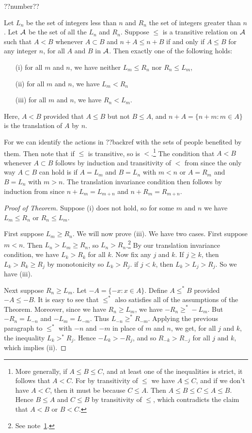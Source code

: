 ??number??
\begin{theorem} Let $L_n$ be the set of integers less than $n$
and $R_n$ the set of integers greater than $n$. Let $\mathcal A$ be the set of all
the $L_n$ and $R_n$. Suppose $\le$ is a transitive relation on $\mathcal A$ such that 
$A<B$ whenever $A\subset B$ and $n+A\le n+B$ if and only if $A\le B$ for any integer
$n$, for all $A$ and $B$ in $\mathcal A$. Then exactly one of the following holds:
\begin{itemize}
\item[{(i)}] for all $m$ and $n$, we have neither $L_m\le R_n$ nor $R_n\le L_m$,
\item[{(ii)}] for all $m$ and $n$, we have $L_m<R_n$
\item[{(iii)}] for all $m$ and $n$, we have $R_n<L_m$.
\end{itemize}
\end{theorem}
Here, $A<B$ provided that $A\le B$ but not $B\le A$, and $n+A=\{n+m:m\in A\}$ is the 
translation of $A$ by $n$.

For we can identify the actions in ??backref with the sets of people benefited by them.
Then note that if $\le$ is transitive, so is $<$.\footnote{\label{fn:trans}More generally, if $A\le B\le C$, and 
at least  one of the inequalities is strict, it follows that $A<C$. For by transitivity of 
$\le$ we have $A\le C$, and if we don't have $A<C$, then it must be because $C\le A$. Then
$A\le B\le C\le A\le B$. Hence $B\le A$ and $C\le B$ by transitivity of $\le$, which contradicts
the claim that $A<B$ or $B<C$.}
The condition that $A<B$ whenever $A\subset B$ follows by induction and transitivity of $<$ 
from  since the only way
$A\subset B$ can hold is if $A=L_m$ and $B=L_n$ with $m<n$ or $A=R_m$ and $B=L_n$ with $m>n$.
The translation invariance condition then follows by induction from  since $n+L_m=L_{m+n}$
and $n+R_m=R_{m+n}$.

\begin{proof}[Proof of Theorem]
Suppose (i) does not hold, so for some $m$ and $n$ we have $L_m\le R_n$ or $R_n\le L_m$.

First suppose $L_m\ge R_n$. We will now prove (iii). 
We have two cases. First suppose $m<n$. Then 
$L_n>L_m\ge R_n$, so $L_n>R_n$.\footnote{See note~\ref{fn:trans}.}
By our translation invariance condition, we have $L_k>R_k$ for all $k$.
Now fix any $j$ and $k$. If $j\ge k$, then 
$L_k>R_k\ge R_j$ by monotonicity so $L_k>R_j$. if 
$j<k$, then $L_k>L_j>R_j$. So we have (iii).

Next suppose $R_n\ge L_m$. Let $-A = \{ -x : x \in A \}$.
Define $A \le^* B$ provided $-A \le -B$. It is easy 
to see that $\le^*$ also satisfies all of the 
assumptions of the Theorem. Moreover, since we have
$R_n\ge L_m$, we have $-R_n\ge^* -L_m$. But 
$-R_n = L_{-n}$ and $-L_m=L_{-m}$. Thus $L_{-n}\ge^* R_{-m}$.
Applying the previous paragraph to $\le^*$ with 
$-n$ and $-m$ in place of $m$ and $n$, we get, for 
all $j$ and $k$, the inequality $L_k>^*R_j$.
Hence $-L_k>-R_j$, and so $R_{-k}>R_{-j}$ for all
$j$ and $k$, which implies (ii).
\end{proof}

\chaptertail

